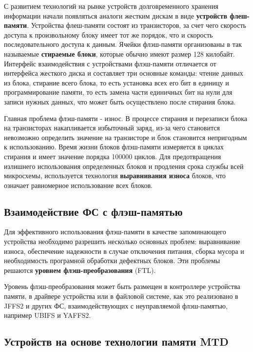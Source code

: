 С развитием технологий на рынке устройств долговременного хранения информации начали появляться аналоги жестким дискам в виде \textbf{устройств флеш-памяти}. Устройства флеш-памяти состоят из транзисторов, за счет чего скорость доступа к произвольному блоку имеет тот же порядок, что и скорость последовательного доступа к данным. Ячейки флэш-памяти организованы в так называемые \textbf{стираемые блоки}, которые обычно имеют размер 128 килобайт. Интерфейс взаимодействия с устройствами флэш-памяти отличается от интерфейса жесткого диска и составляет три основные команды: чтение данных из блока, стирание всего блока, то есть установка всех его бит в единицу и программирование памяти, то есть замена части единичных бит на нули для записи нужных данных, что может быть осуществлено после стирания блока.

Главная проблема флэш-памяти - износ. В процессе стирания и перезаписи блока на транзисторах накапливается избыточный заряд, из-за чего становится невозможно определить значение на транзисторе и блок становится непригодным к использованию. Время жизни блоков флэш-памяти измеряется в циклах стирания и имеет значение порядка 100000 циклов. Для предотвращения излишнего использования определенных блоков и продления срока службы всей микросхемы, используется технология \textbf{выравнивания износа} блоков, что означает равномерное использование всех блоков.

\subsection{Взаимодействие ФС с флэш-памятью}

Для эффективного использования флэш-памяти в качестве запоминающего устройства необходимо разрешить несколько основных проблем: выравнивание износа, обеспечение надежности в случае отключения питания, сборка мусора и необходимость програмной обработки дефектных блоков. Эти проблемы решаются \textbf{уровнем флэш-преобразования} (FTL). 

Уровень флэш-преобразования может быть размещен в контроллере устройства памяти, в драйвере устройства или в файловой системе, как это реализовано в JFFS2 и других ФС, взаимодействующих с неуправляемой флэш-памятью, например UBIFS и YAFFS2.

\subsection{Устройств на основе технологии памяти MTD}

